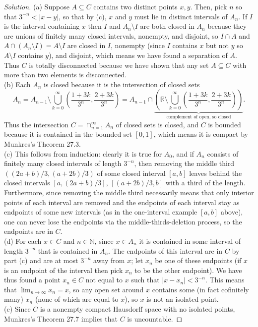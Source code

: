 \documentclass[10pt]{article}
\providecommand{\NN}{\mathbb N}
\providecommand{\RR}{\mathbb R}
\newenvironment{soln}{\begin{proof}[Solution]}{\end{proof}}
\providecommand{\abs}[1]{\left|#1\right|}
\begin{document}
\begin{soln}
    (a) Suppose $A\subseteq C$ contains two distinct points $x,y$.
    Then, pick $n$ so that $3^{-n} < \abs{x-y}$, so that by (c),
    $x$ and $y$ must lie in distinct intervals of $A_n$.
    If $I$ is the interval containing $x$ then $I$ and $A_n\setminus I$
    are both closed in $A_n$ because they are unions of finitely many closed intervals,
    nonempty, and disjoint, so $I\cap A$ and $A\cap(A_n\setminus I) = A\setminus I$
    are closed in $I$, nonempty (since $I$ contains $x$ but not $y$
    so $A\setminus I$ contains $y$), and disjoint, which means
    we have found a separation of $A$.
    Thus $C$ is totally disconnected
    because we have shown that any set $A\subseteq C$
    with more than two elements is disconnected.
    \\

    (b) Each $A_n$ is closed because it is the intersection of closed sets
    \begin{equation*}
	A_n = A_{n-1}\setminus\bigcup_{k=0}^\infty
	\left(\frac{1+3k}{3^n},\frac{2+3k}{3^n}\right)
	= A_{n-1}\cap\underbrace{\left(\RR\setminus\bigcup_{k=0}^\infty
	\left(\frac{1+3k}{3^n},\frac{2+3k}{3^n}\right)\right)}_
	{\text{complement of open, so closed}}.
    \end{equation*}
    Thus the intersection $C = \cap_{n=1}^\infty A_n$ of closed sets
    is closed, and $C$ is bounded because it is contained in the bounded set $[0,1]$,
    which means it is compact by Munkres's Theorem 27.3.
    \\

    (c) This follows from induction: clearly it is true for $A_0$,
    and if $A_n$ consists of finitely many closed intervals of length $3^{-n}$,
    then removing the middle third $((2a+b)/3, (a+2b)/3)$ of
    some closed interval $[a,b]$ leaves behind the closed intervals
    $[a,(2a+b)/3]$, $[(a+2b)/3, b]$ with a third of the length.
    Furthermore, since removing the middle third
    necessarily means that only interior points of each interval are removed
    and the endpoints of each interval stay as endpoints of some new intervals
    (as in the one-interval example $[a,b]$ above), one can never lose the endpoints
    via the middle-thirds-deletion process, so the endpoints are in $C$.
    \\

    (d) For each $x\in C$ and $n\in\NN$, since $x\in A_n$
    it is contained in some interval of length $3^{-n}$ that is contained in $A_n$.
    The endpoints of this interval are in $C$ by part (c)
    and are at most $3^{-n}$ away from $x$; let $x_n$ be one of these endpoints
    (if $x$ is an endpoint of the interval then pick $x_n$ to be the other endpoint).
    We have thus found a point $x_n\in C$ not equal to $x$
    such that $\abs{x-x_n} < 3^{-n}$. This means that $\lim_{n\to\infty}x_n = x$,
    so any open set around $x$ contains some (in fact cofinitely many)
    $x_n$ (none of which are equal to $x$), so $x$ is not an isolated point.
    \\

    (e) Since $C$ is a nonempty compact Hausdorff space with no isolated points,
    Munkres's Theorem 27.7 implies that $C$ is uncountable.
\end{soln}
\end{document}
